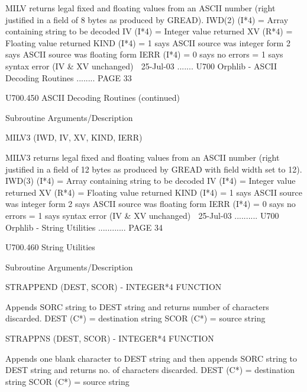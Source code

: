                        MILV returns legal fixed and floating values from an
                       ASCII number (right justified in a field of 8 bytes as
                       produced by GREAD).
                       IWD(2)  (I*4) = Array containing string to be decoded
                       IV      (I*4) = Integer  value returned
                       XV      (R*4) = Floating value returned
                       KIND    (I*4) = 1 says ASCII source was integer  form
                                       2 says ASCII source was floating form
                       IERR    (I*4) = 0 says no errors
                                     = 1 says syntax error (IV & XV unchanged)
    
   25-Jul-03 ....... U700  Orphlib - ASCII Decoding Routines ........ PAGE  33
 
 
   U700.450  ASCII Decoding Routines (continued)
 
 
   Subroutine          Arguments/Description
 
   MILV3              (IWD, IV, XV, KIND, IERR)
 
                       MILV3 returns legal fixed and floating values from an
                       ASCII number (right justified in a field of 12 bytes as
                       produced by GREAD with field width set to 12).
                       IWD(3)  (I*4) = Array containing string to be decoded
                       IV      (I*4) = Integer  value returned
                       XV      (R*4) = Floating value returned
                       KIND    (I*4) = 1 says ASCII source was integer  form
                                       2 says ASCII source was floating form
                       IERR    (I*4) = 0 says no errors
                                     = 1 says syntax error (IV & XV unchanged)
    
   25-Jul-03 .......... U700  Orphlib - String Utilities ............ PAGE  34
 
 
   U700.460  String Utilities
 
   Subroutine          Arguments/Description
 
   STRAPPEND          (DEST, SCOR)  -  INTEGER*4 FUNCTION
 
                       Appends SORC string to DEST string and returns number
                       of characters discarded.
                       DEST (C*) = destination string
                       SCOR (C*) = source      string
 
   STRAPPNS           (DEST, SCOR)  -  INTEGER*4 FUNCTION
 
                       Appends one blank character to DEST string and then
                       appends SORC string to DEST string and returns no. of
                       characters discarded.
                       DEST (C*) = destination string
                       SCOR (C*) = source      string
 
